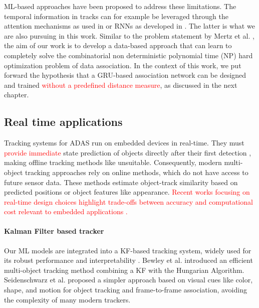 \documentclass[letterpaper, 10 pt, journal, twoside]{IEEEtran}
\newcommand{\red}[1]{\textcolor{red}{#1}}
\begin{document}
\ac{ML}-based approaches have been proposed to address these limitations.
The temporal information in tracks can for example be leveraged through the attention mechanisms as used in {\cite{DL_ATT_CNN_soda.2020, DL_ATT_CNN_mot_sot_based.2017}} or \acp{RNN} as developed in {\cite{DL_RNN_mot.2016, DL_RNN_data_association.2019}}.
The latter is what we are also pursuing in this work.
Similar to the problem statement by Mertz et al. {\cite{DL_RNN_data_association.2019}}, the aim of our work is to develop a data-based approach that can learn to completely solve the combinatorial non deterministic polynomial time (NP) hard optimization problem of data association.
In the context of this work, we put forward the hypothesis that a \ac{GRU}-based association network can be designed and trained \red{without a predefined distance measure}, as discussed in the next chapter.

\subsection{Real time applications}
Tracking systems for ADAS run on embedded devices in real-time. They must \red{provide immediate} state prediction of objects directly after their first detection {\cite{KF_Bewley.2016,DL_Wojke.2017}}, making offline tracking methods like {\cite{offline_mot.2017}} unsuitable. Consequently, modern multi-object tracking approaches rely on online methods, which do not have access to future sensor data. These methods estimate object-track similarity based on predicted positions or object features like appearance.
\red{Recent works focusing on real-time design choices highlight trade-offs between accuracy and computational cost relevant to embedded applications {\cite{Wang2019RealtimeMOT,Zhou2020CenterTrack}}.}

\paragraph{Kalman Filter based tracker}
Our \ac{ML} models are integrated into a \ac{KF}-based tracking system, widely used for its robust performance and interpretability {\cite{KF_Wan.2000,KF_Ristic.2004,KF_Julier.2004,KF_framework.2013,KF_Bewley.2016,KF_simple_cues.2022,KF_BoundingBD.2023}}. Bewley et al. {\cite{KF_Bewley.2016}} introduced an efficient multi-object tracking method combining a KF with the Hungarian Algorithm. Seidenschwarz et al. {\cite{KF_simple_cues.2022}} proposed a simpler approach based on visual cues like color, shape, and motion for object tracking and frame-to-frame association, avoiding the complexity of many modern trackers.
\end{document}

